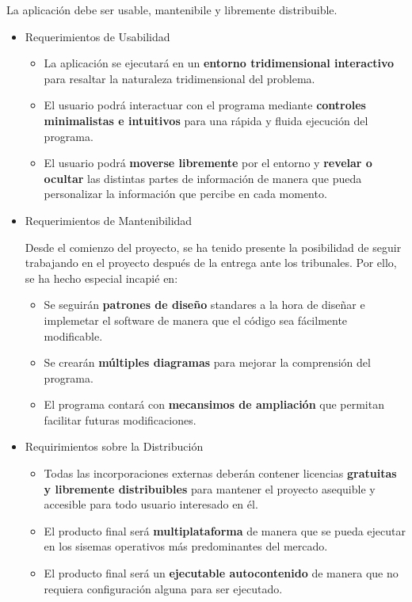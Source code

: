 \documentclass[12pt,a4paper,openright,oneside]{article}
\numberwithin{equation}{section}
\theoremstyle{definition}
\begin{document}
La aplicación debe ser usable, mantenibile y libremente distribuible.
\begin{itemize}
\item Requerimientos de Usabilidad

\begin{itemize}

\item La aplicación se ejecutará en un \textbf{entorno tridimensional interactivo} para resaltar la naturaleza tridimensional del problema.

\item El usuario podrá interactuar con el programa mediante \textbf{controles minimalistas e intuitivos} para una rápida y fluida ejecución del programa.

\item El usuario podrá \textbf{moverse libremente} por el entorno y \textbf{revelar o ocultar} las distintas partes de información de manera que pueda personalizar la información que percibe en cada momento.

\end{itemize}

\item Requerimientos de Mantenibilidad

Desde el comienzo del proyecto, se ha tenido presente la posibilidad de seguir trabajando en el proyecto después de la entrega ante los tribunales. Por ello, se ha hecho especial incapié en:

\begin{itemize}

\item Se seguirán \textbf{patrones de diseño} standares a la hora de diseñar e implemetar el software de manera que el código sea fácilmente modificable.

\item Se crearán \textbf{múltiples diagramas} para mejorar la comprensión del programa.

\item El programa contará con \textbf{mecansimos de ampliación} que permitan facilitar futuras modificaciones.

\end{itemize}

\item Requirimientos sobre la Distribución

\begin{itemize}

\item Todas las incorporaciones externas deberán contener licencias \textbf{gratuitas y libremente distribuibles} para mantener el proyecto asequible y accesible para todo usuario interesado en él.

\item El producto final será \textbf{multiplataforma} de manera que se pueda ejecutar en los sisemas operativos más predominantes del mercado.

\item El producto final será un \textbf{ejecutable autocontenido} de manera que no requiera configuración alguna para ser ejecutado.

\end{itemize}
\end{itemize}
\end{document}
